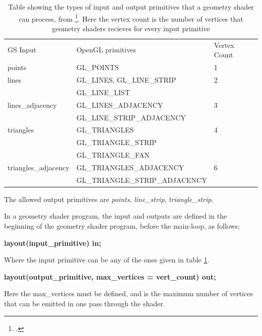 \documentclass[a4paper, 12pt]{article}
\newcommand{\headcol}{\rowcolor{tableheadcolor}} %
\newcommand{\rowcol}{\rowcolor{tablerowcolor}} %
\begin{document}
\begin{table}
\centering
\caption{Table showing the types of input and output primitives that a geometry shader can process, from \footcite{GEOM}. Here the vertex count is the number of vertices that geometry shaders recieves for every input primitive }
\label{tab:GSprimitives}
\begin{tabular}{lll} \toprule
GS Input & OpenGL primitives & Vertex Count \\\headcol \midrule
\headcol points& GL\_POINTS​&1\\
\rowcol lines& GL\_LINES​, GL\_LINE\_STRIP​​&2\\
\rowcol &  GL\_LINE\_LIST&\\
\headcol lines\_adjacency&GL\_LINES\_ADJACENCY​&​3\\
\headcol & GL\_LINE\_STRIP\_ADJACENCY&\\
\rowcol triangles&GL\_TRIANGLES​​&4\\
\rowcol & GL\_TRIANGLE\_STRIP​&\\
\rowcol &GL\_TRIANGLE\_FAN&\\
\headcol triangles\_adjacency&GL\_TRIANGLES\_ADJACENCY​​&6\\
\headcol & GL\_TRIANGLE\_STRIP\_ADJACENCY&\\\midrule
\end{tabular}
\end{table}

The allowed output primitives are \emph{points}, \emph{line\_strip}, \emph{triangle\_strip}.

In a geometry shader program, the input and outputs are defined in the beginning of the geometry shader program, before the main-loop, as follows;
\begin{center}
\textbf{layout(input\_primitive​) in;}
\end{center}
Where the input primitive can be any of the ones given in table \ref{tab:GSprimitives}. 
\begin{center}
\textbf{layout(output\_primitive​, max\_vertices = vert\_count​) out;}
\end{center}
Here the max\_vertices must be defined, and is the maximum number of vertices that can be emitted in one pass through the shader.
\end{document}
